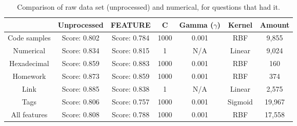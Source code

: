 \begin{table}[tbp]
	\centering
	\begin{tabular}{| c | c | c | c | c | c | c |}
		\hline
		~				& Unprocessed		& FEATURE		& C			& Gamma ($\gamma$)	& Kernel	& Amount	 	\\ \hline
		Code samples 	& Score: 0.802		& Score: 0.784	& 1000		& 0.001				& RBF 		& 9,855 		\\ \hline
		Numerical		& Score: 0.834		& Score: 0.815	& 1			& N/A				& Linear	& 9,024			\\ \hline
		Hexadecimal		& Score: 0.859		& Score: 0.883	& 1000		& 0.001				& RBF		& 160 			\\ \hline
		Homework 		& Score: 0.873		& Score: 0.859	& 1000		& 0.001				& RBF		& 374 			\\ \hline
		Link			& Score: 0.885		& Score: 0.838	& 1			& N/A				& Linear	& 2,575			\\ \hline
		Tags			& Score: 0.806		& Score: 0.757	& 1000		& 0.001				& Sigmoid	& 19,967		\\ \hline
		All features	& Score: 0.808		& Score: 0.788	& 1000		& 0.001				& RBF 		& 17,558		\\ \hline
	\end{tabular}
	\caption{Comparison of raw data set (unprocessed) and numerical, for questions that had it.}
	\label{tab:comparison_of_feature_occurences_only}
\end{table}

\begin{comment}
\begin{table}[tbp]
\centering
\begin{tabular}{| c | c | c | c | c |}
\hline
~				& Votes < 0			& Votes = 0			& Votes > 0		& All			\\ \hline
Amount			& 659,955			& 5,256,105			& 5,286,971		& 11,203,031	\\ \hline
Oldest			& 06.08.2008		& 06.08.2008		& 31.07.2008	& 31.07.2008 	\\ \hline
Newest			& 06.03.2016		& 06.03.2016		& 06.03.2016	& 06.03.2016	\\ \hline
Vote (lowest)	& -147				& 0					& 1				& -147	 		\\ \hline
Vote (highest)	& -1				& 0					& 13845			& 13845	 		\\ \hline
\end{tabular}
\caption{Overview of the Stack Overflow dataset.}
\label{tab:dataset_overview_so2}
\end{table}
\end{comment}

